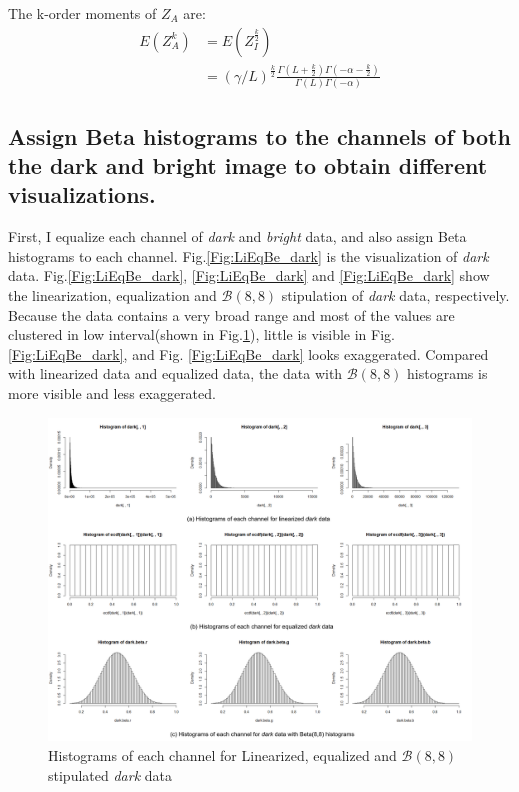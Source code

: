 \documentclass[conference,onecolumn]{IEEEtran}
\begin{document}
The k-order moments of $Z_A$ are:
\begin{equation}
\begin{split}
E(Z_A^k) &= E(Z_I^{\frac{k}{2}}) \\
&= (\gamma / L)^{\frac{k}{2}} \frac{\Gamma(L+\frac{k}{2})\Gamma(-\alpha-\frac{k}{2})}{\Gamma(L)\Gamma(-\alpha)}
\end{split}
\label{eq:Moment_ZA_G0_dis}
\end{equation}


\subsection{Assign Beta histograms to the channels of both the dark and bright image to obtain different visualizations.}

First, I equalize each channel of \textit{dark} and \textit{bright} data, and also assign Beta histograms to each channel. Fig.\ref{Fig:LiEqBe_dark} is the visualization of \textit{dark} data. Fig.\ref{Fig:LiEqBe_dark}, \ref{Fig:LiEqBe_dark} and \ref{Fig:LiEqBe_dark} show the linearization, equalization and $\mathcal{B}(8,8)$ stipulation of \textit{dark} data, respectively. Because the data contains a very broad range and most of the values are clustered in low interval(shown in Fig.\ref{Fig:hist_dark_LiEqBe}), little is visible in Fig.\ref{Fig:LiEqBe_dark}, and Fig. \ref{Fig:LiEqBe_dark} looks exaggerated. Compared with linearized data and equalized data, the data with $\mathcal{B}(8,8)$ histograms is more visible and less exaggerated.  
\begin{figure}[htbp]
	\centering
	\includegraphics[width=.8\linewidth]{hist_dark_LiEqBe.png}
	\caption{Histograms of each channel for Linearized, equalized and $\mathcal{B}(8,8)$ stipulated \textit{dark} data}
	\label{Fig:hist_dark_LiEqBe}
\end{figure}
\end{document}

